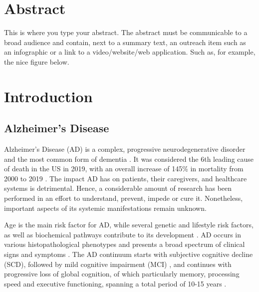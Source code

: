 \documentclass{amsart}
\newcommand{\mainmatter}{
    \newpage
    \pagenumbering{arabic}  %
}
\begin{document}
\newpage
\section*{Abstract}
This is where you type your abstract.
The abstract must be communicable to a broad audience and contain, next to a summary text, an outreach item such as an infographic or a link to a video/website/web application.
Such as, for example, the nice figure below.


\clearpage
\printacronyms[title = Abbreviations, toctitle = Abbreviations]

\newpage
\tableofcontents

\mainmatter

\newpage
\section{Introduction}\label{Intro}
\subsection{Alzheimer’s Disease}
Alzheimer’s Disease (AD) is a complex, progressive neurodegenerative disorder and the most common form of dementia \cite{Penke2023NewDisease}. It was considered the 6th leading cause of death in the US in 2019, with an overall increase of 145\% in mortality from 2000 to 2019 \cite{20232023Figures}. The impact AD has on patients, their caregivers, and healthcare systems is detrimental. Hence, a considerable amount of research has been performed in an effort to understand, prevent, impede or cure it. Nonetheless, important aspects of its systemic manifestations remain unknown.

Age is the main risk factor for AD, while several genetic and lifestyle risk factors, as well as biochemical pathways contribute to its development \cite{Penke2023NewDisease}. AD occurs in various histopathological phenotypes and presents a broad spectrum of clinical signs and symptoms \cite{Heneka2015NeuroinflammationDisease, Edwards2019ANeurodegeneration}. The AD continuum starts with subjective cognitive decline (SCD), followed by mild cognitive impairment (MCI) \cite*{AALDIJK2022101556}, and continues with progressive loss of global cognition, of which particularly memory, processing speed and executive functioning, spanning a total period of 10-15 years \cite{Scheltens2016AlzheimersDisease}. 
\end{document}
